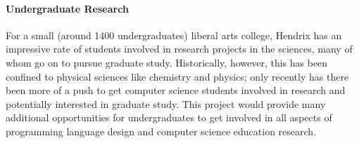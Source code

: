 \paragraph{Undergraduate Research}  For a small (around 1400
undergraduates) liberal arts college, Hendrix has an impressive rate
of students involved in research projects in the sciences, many of
whom go on to pursue graduate study.  Historically, however, this has
been confined to physical sciences like chemistry and physics; only
recently has there been more of a push to get computer science
students involved in research and potentially interested in graduate
study.  This project would provide many additional opportunities for
undergraduates to get involved in all aspects of programming language
design and computer science education research.
